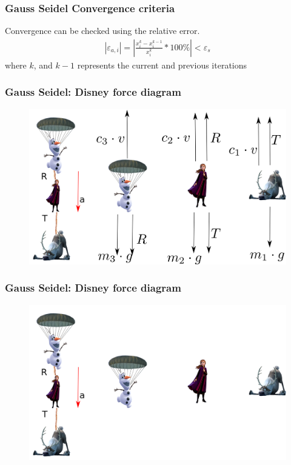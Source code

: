 \documentclass[notes]{beamer}
\begin{document}
\begin{frame}
	\frametitle{Gauss Seidel Convergence criteria}
	Convergence can be checked using the relative error.
	\begin{align*}
	\left|\varepsilon_{a, i}\right| = \left|\frac{x_i^k - x_i^{k-1}}{x_i^k}*100\% \right|< \varepsilon_s
	\end{align*}
	where $k$, and $k-1$ represents the current and previous iterations
\end{frame}




\begin{frame}
	\frametitle{Gauss Seidel: Disney force diagram}
		\begin{figure}[ht]
			\centering
			\includegraphics[width=\textwidth]{figs/freebody.png}
		\end{figure}
\end{frame}


\begin{frame}
	\frametitle{Gauss Seidel: Disney force diagram}
		\begin{figure}[ht]
			\centering
			\includegraphics[width=\textwidth]{figs/freebody-empty.png}
		\end{figure}		
\end{frame}
\end{document}
